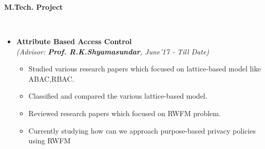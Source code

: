 \documentclass[a4paper,10pt]{article}
\newcommand{\isep}{-2 pt}
\newcommand{\lsep}{-0.5cm}
\newcommand{\resheading}[1]{{\small \colorbox{mygrey}{\begin{minipage}{0.975\textwidth}{\textbf{#1 \vphantom{p\^{E}}}}\end{minipage}}}}
\begin{document}
\hspace{0.5cm}\\
\hspace{0.5cm}\\
\hspace{0.5cm}\\
\hspace{0.5cm}\\
\hspace{0.5cm}\\
\hspace{0.5cm}\\
\hspace{0.5cm}\\
\hspace{0.5cm}\\
\hspace{0.5cm}\\
\hspace{0.5cm}\\
\hspace{0.5cm}\\
\hspace{0.5cm}\\
\hspace{0.5cm}\\
\hspace{0.5cm}\\
\hspace{0.5cm}\\[-0.2cm]

\resheading{\textbf{\large M.Tech. Project} }\\[\lsep]
\begin{itemize}
\item \textbf { Attribute Based Access Control}\\
 \emph{(Advisor: \textbf{Prof. R.K.Shyamasundar}, June'17 - Till Date)} \\[-0.6cm]
	\begin{itemize}\itemsep \isep
	\item Studied various research papers which focused on lattice-based model like ABAC,RBAC.
	\item  Classified and compared the various lattice-based model. 
	\item Reviewed research papers which focused on RWFM problem.
	\item Currently studying how can we approach purpose-based privacy policies using RWFM

	\end{itemize}

\end{itemize}
\end{document}
